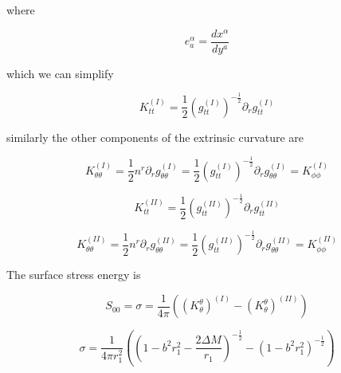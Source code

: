 \documentclass[aps,showpacs,onecolumn,floats,prd,superscriptaddress,nofootinbib]{revtex4-1}
\begin{document}
where 

\begin{equation}
	e^\alpha_a = \frac{d x^\alpha}{dy^a}
\end{equation}

which we can simplify 

\begin{equation}
	K_{tt}^{(I)} = \frac{1}{2} (g_{tt}^{(I)})^{-\frac{1}{2}}  \partial_r g_{tt}^{(I)}
\end{equation}

similarly the other components of the extrinsic curvature are

\begin{equation}
	K_{\theta \theta}^{(I)}= \frac{1}{2} n^r \partial_r g^{(I)}_{\theta \theta} = \frac{1}{2} (g_{tt}^{(I)})^{-\frac{1}{2}} \partial_r g_{\theta \theta}^{(I)} = K_{\phi \phi}^{(I)}
\end{equation}

\begin{equation}
	K_{tt}^{(II)} = \frac{1}{2} (g_{tt}^{(II)})^{-\frac{1}{2}}  \partial_r g_{tt}^{(II)}
\end{equation}

\begin{equation}
	K_{\theta \theta}^{(II)}= \frac{1}{2} n^r \partial_r g^{(II)}_{\theta \theta} = \frac{1}{2} (g_{tt}^{(II)})^{-\frac{1}{2}} \partial_r g_{\theta \theta}^{(II)} = K_{\phi \phi}^{(II)}
\end{equation}

The surface stress energy is

\begin{equation}
	S_{00} = \sigma = \frac{1}{4 \pi} ((K^\theta_\theta)^{(I)} - (K^\theta_{\theta})^{(II)})
\end{equation}

\begin{equation}
	\sigma = \frac{1}{4 \pi r_1^2} \left( \left( 1 - b^2r_1^2 - \frac{2 \Delta M}{r_1} \right)^{-\frac{1}{2}} - \left( 1- b^2 r_1^2 \right)^{-\frac{1}{2}} \right)
\end{equation}





























\end{document}
